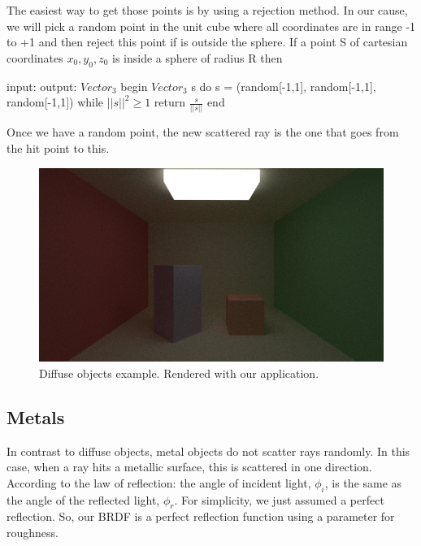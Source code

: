 \documentclass[titlepage,12pt]{report}
\begin{document}
The easiest way to get those points is by using a rejection method. In our cause, we will pick a random point in the unit cube where all coordinates are in range -1 to +1 and then reject this point if is outside the sphere. If a point S of cartesian coordinates $x_0, y_0, z_0$ is inside a sphere of radius R then 

\begin{algorithm}[caption={random\_on\_unit\_sphere}]
input: 
output: $Vector_3$
begin
  $Vector_3$ s
  do
    s = (random[-1,1], random[-1,1], random[-1,1])
  while $||s||^2 \geq 1$
  return $\frac{s}{||s||}$
end
\end{algorithm}

Once we have a random point, the new scattered ray is the one that goes from the hit point to this.

\begin{figure}[H]
	\centering
	\includegraphics[scale=0.65]{media/cornell_normal_test.png}
	\caption{Diffuse objects example. Rendered with our application.}
	\label{diff3}
\end{figure}

\subsection{Metals}

In contrast to diffuse objects, metal objects do not scatter rays randomly. In this case, when a ray hits a metallic surface, this is scattered in one direction. According to the law of reflection: the angle of incident light, $\phi_i$, is the same as the angle of the reflected light, $\phi_r$. For simplicity, we just assumed a perfect reflection. So, our BRDF is a perfect reflection function using a parameter for roughness.
\end{document}
